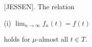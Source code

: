 [JESSEN]. The relation

(i) $\lim_{n \to \infty} f_n(t) = f(t)$

holds for $\mu$-almost all $t \in T$.